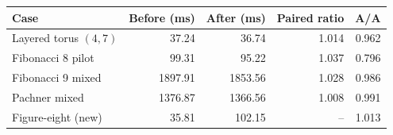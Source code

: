 \begin{center}
\small
\begin{tabular}{lrrrr}
\toprule
Case & Before (ms) & After (ms) & Paired ratio & A/A \\
\midrule
Layered torus $(4,7)$ & 37.24 & 36.74 & 1.014 & 0.962 \\
Fibonacci 8 pilot & 99.31 & 95.22 & 1.037 & 0.796 \\
Fibonacci 9 mixed & 1897.91 & 1853.56 & 1.028 & 0.986 \\
Pachner mixed & 1376.87 & 1366.56 & 1.008 & 0.991 \\
Figure-eight (new) & 35.81 & 102.15 & -- & 1.013 \\
\bottomrule
\end{tabular}
\end{center}
